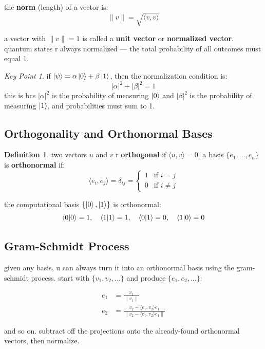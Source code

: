 \documentclass[11pt,a4paper]{article}
\theoremstyle{definition}
\newtheorem{definition}{Definition}[section]
\theoremstyle{remark}
\newtheorem*{keypoint}{Key Point}
\begin{document}
the \textbf{norm} (length) of a vector is:
\[
\|v\| = \sqrt{\langle v, v \rangle}
\]

a vector with $\|v\| = 1$ is called a \textbf{unit vector} or \textbf{normalized vector}. quantum states r always normalized --- the total probability of all outcomes must equal 1.

\begin{keypoint}
if $\ket{\psi} = \alpha\ket{0} + \beta\ket{1}$, then the normalization condition is:
\[
\boxed{|\alpha|^2 + |\beta|^2 = 1}
\]
this is bcs $|\alpha|^2$ is the probability of measuring $\ket{0}$ and $|\beta|^2$ is the probability of measuring $\ket{1}$, and probabilities must sum to 1.
\end{keypoint}

\subsection{Orthogonality and Orthonormal Bases}

\begin{definition}
two vectors $u$ and $v$ r \textbf{orthogonal} if $\langle u, v \rangle = 0$. a basis $\{e_1, \ldots, e_n\}$ is \textbf{orthonormal} if:
\[
\langle e_i, e_j \rangle = \delta_{ij} = \begin{cases} 1 & \text{if } i = j \\ 0 & \text{if } i \neq j \end{cases}
\]
\end{definition}

the computational basis $\{\ket{0}, \ket{1}\}$ is orthonormal:
\[
\braket{0|0} = 1, \quad \braket{1|1} = 1, \quad \braket{0|1} = 0, \quad \braket{1|0} = 0
\]

\subsection{Gram-Schmidt Process}

given any basis, u can always turn it into an orthonormal basis using the gram-schmidt process. start with $\{v_1, v_2, \ldots\}$ and produce $\{e_1, e_2, \ldots\}$:

\begin{align}
e_1 &= \frac{v_1}{\|v_1\|} \\
e_2 &= \frac{v_2 - \langle e_1, v_2 \rangle e_1}{\|v_2 - \langle e_1, v_2 \rangle e_1\|}
\end{align}

and so on. subtract off the projections onto the already-found orthonormal vectors, then normalize.
\end{document}
